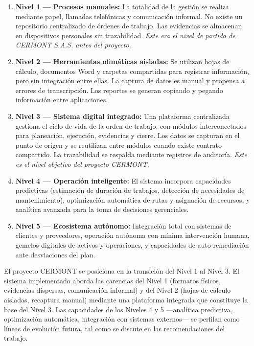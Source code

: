 \begin{enumerate}
    \item \textbf{Nivel 1 — Procesos manuales:} La totalidad de la gestión se realiza mediante papel, llamadas telefónicas y comunicación informal. No existe un repositorio centralizado de órdenes de trabajo. Las evidencias se almacenan en dispositivos personales sin trazabilidad. \textit{Este era el nivel de partida de CERMONT S.A.S. antes del proyecto.}
    \item \textbf{Nivel 2 — Herramientas ofimáticas aisladas:} Se utilizan hojas de cálculo, documentos Word y carpetas compartidas para registrar información, pero sin integración entre ellas. La captura de datos es manual y propensa a errores de transcripción. Los reportes se generan copiando y pegando información entre aplicaciones.
    \item \textbf{Nivel 3 — Sistema digital integrado:} Una plataforma centralizada gestiona el ciclo de vida de la orden de trabajo, con módulos interconectados para planeación, ejecución, evidencias y cierre. Los datos se capturan en el punto de origen y se reutilizan entre módulos cuando existe contrato compartido. La trazabilidad se respalda mediante registros de auditoría. \textit{Este es el nivel objetivo del proyecto CERMONT.}
    \item \textbf{Nivel 4 — Operación inteligente:} El sistema incorpora capacidades predictivas (estimación de duración de trabajos, detección de necesidades de mantenimiento), optimización automática de rutas y asignación de recursos, y analítica avanzada para la toma de decisiones gerenciales.
    \item \textbf{Nivel 5 — Ecosistema autónomo:} Integración total con sistemas de clientes y proveedores, operación autónoma con mínima intervención humana, gemelos digitales de activos y operaciones, y capacidades de auto-remediación ante desviaciones del plan.
\end{enumerate}

El proyecto CERMONT se posiciona en la transición del Nivel 1 al Nivel 3. El sistema implementado aborda las carencias del Nivel 1 (formatos físicos, evidencias dispersas, comunicación informal) y del Nivel 2 (hojas de cálculo aisladas, recaptura manual) mediante una plataforma integrada que constituye la base del Nivel 3. Las capacidades de los Niveles 4 y 5 —analítica predictiva, optimización automática, integración con sistemas externos— se perfilan como líneas de evolución futura, tal como se discute en las recomendaciones del trabajo.

